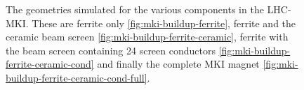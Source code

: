 \begin{figure}
\label{fig:mki-layout-buildup}
\caption{The geometries simulated for the various components in the LHC-MKI. These are ferrite only \ref{fig:mki-buildup-ferrite}, ferrite and the ceramic beam screen \ref{fig:mki-buildup-ferrite-ceramic}, ferrite with the beam screen containing 24 screen conductors \ref{fig:mki-buildup-ferrite-ceramic-cond} and finally the complete MKI magnet \ref{fig:mki-buildup-ferrite-ceramic-cond-full}.}
\end{figure}

